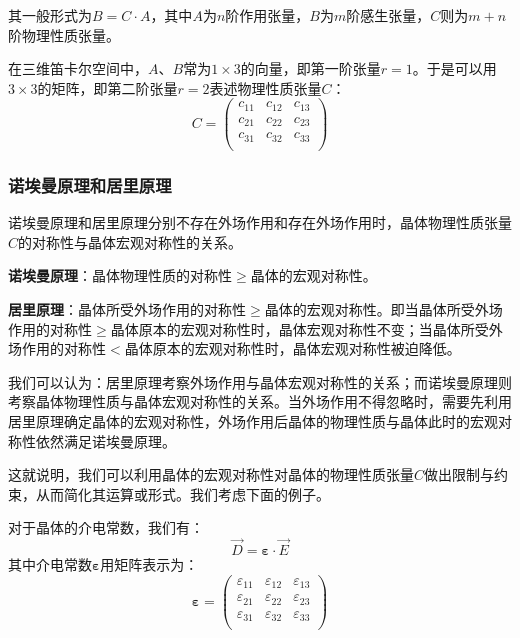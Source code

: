     其一般形式为$B=C\cdot A$，其中$A$为$n$阶作用张量，$B$为$m$阶感生张量，$C$则为$m+n$阶物理性质张量。
    
    在三维笛卡尔空间中，$A$、$B$常为$1\times 3$的向量，即第一阶张量$r=1$。于是可以用$3\times 3$的矩阵，即第二阶张量$r=2$表述物理性质张量$C$：
    \[
    C=
    \left(
    \begin{array}{ccc}
        c_{11} & c_{12} & c_{13} \\
        c_{21} & c_{22} & c_{23} \\
        c_{31} & c_{32} & c_{33} \\
    \end{array}
    \right)
    \]

\subsubsection{诺埃曼原理和居里原理}
    诺埃曼原理和居里原理分别不存在外场作用和存在外场作用时，晶体物理性质张量$C$的对称性与晶体宏观对称性的关系。

    \textbf{诺埃曼原理}：晶体物理性质的对称性$\geq$晶体的宏观对称性。

    \textbf{居里原理}：晶体所受外场作用的对称性$\geq$晶体的宏观对称性。即当晶体所受外场作用的对称性$\geq$晶体原本的宏观对称性时，晶体宏观对称性不变；当晶体所受外场作用的对称性$<$晶体原本的宏观对称性时，晶体宏观对称性被迫降低。

    我们可以认为：居里原理考察外场作用与晶体宏观对称性的关系；而诺埃曼原理则考察晶体物理性质与晶体宏观对称性的关系。当外场作用不得忽略时，需要先利用居里原理确定晶体的宏观对称性，外场作用后晶体的物理性质与晶体此时的宏观对称性依然满足诺埃曼原理。

    这就说明，我们可以利用晶体的宏观对称性对晶体的物理性质张量$C$做出限制与约束，从而简化其运算或形式。我们考虑下面的例子。

    对于晶体的介电常数，我们有：
    \[
    \vec{D} = \boldsymbol{\varepsilon} \cdot \vec{E}
    \]
    其中介电常数$\boldsymbol{\varepsilon}$用矩阵表示为：
    \[
    \boldsymbol{\varepsilon}=
    \left(
    \begin{array}{ccc}
        \varepsilon_{11} & \varepsilon_{12} & \varepsilon_{13} \\
        \varepsilon_{21} & \varepsilon_{22} & \varepsilon_{23} \\
        \varepsilon_{31} & \varepsilon_{32} & \varepsilon_{33} \\
    \end{array}
    \right)
    \]

